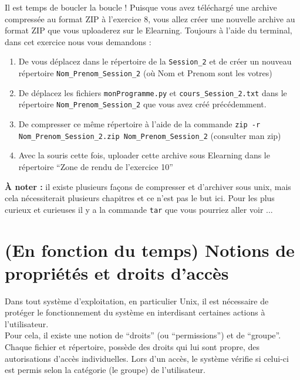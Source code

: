 \documentclass{article}
\begin{document}
\begin{exercice}

Il est temps de boucler la boucle ! Puisque vous avez téléchargé une archive compressée au format ZIP à l'exercice 8, vous allez créer une nouvelle archive au format ZIP que vous uploaderez sur le Elearning. 
Toujours à l'aide du terminal, dans cet exercice nous vous demandons : 

\begin{enumerate}
\item 
De vous déplacez dans le répertoire de la \texttt{Session\_2} et de créer un nouveau répertoire \texttt{Nom\_Prenom\_Session\_2} (où Nom et Prenom sont les votres)
\item 
De déplacez les fichiers \texttt{monProgramme.py} et \texttt{cours\_{Session\_2}.txt} dans le répertoire \texttt{Nom\_Prenom\_Session\_2} que vous avez créé précédemment.
\item 
De compresser ce même répertoire à l'aide de la commande \texttt{zip -r Nom\_Prenom\_Session\_2.zip Nom\_Prenom\_Session\_2} (consulter man zip)
\item
Avec la souris cette fois, uploader cette archive sous Elearning dans le répertoire ``Zone de rendu de l'exercice 10''
\end{enumerate}

\textbf{À noter : } il existe plusieurs fa\c cons de compresser et d'archiver sous unix, mais cela nécessiterait plusieurs chapitres et ce n'est pas le but ici. Pour les plus curieux et curieuses il y a la commande \texttt{tar} que vous pourriez aller voir ...

\end{exercice}


\hypertarget{(En fonction du temps) Notions de propriétés et droits d'accès}{
\section{(En fonction du temps) Notions de propriétés et droits d'accès}\label{(En fonction du temps) Notions de propriétés et droits d'accès}}

Dans tout système d'exploitation, en particulier Unix, il est nécessaire de protéger le
fonctionnement du système en interdisant certaines actions à l'utilisateur.\\
Pour cela, il existe une notion de ``droits'' (ou ``permissions'') et de ``groupe''. \\
Chaque fichier et répertoire, possède des droits qui lui sont propre, des autorisations d'accès individuelles. 
Lors d'un accès, le système vérifie si celui-ci est permis selon la catégorie (le groupe) de l'utilisateur.
\end{document}
